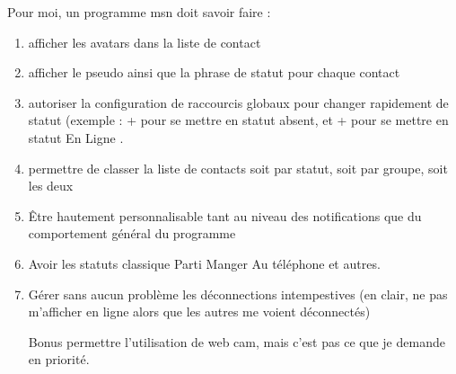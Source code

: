 \documentclass[a4paper,twoside]{article}
\begin{document}
Pour moi, un programme msn doit savoir faire :
\begin{enumerate}
 \item afficher les avatars dans la liste de contact
\item afficher le pseudo ainsi que la phrase de statut pour chaque contact
\item autoriser la configuration de raccourcis globaux pour changer rapidement de statut (exemple : + pour se mettre en statut absent, et + pour se mettre en statut \og En Ligne \fg.
\item permettre de classer la liste de contacts soit par statut, soit par groupe, soit les deux
\item \^Etre hautement personnalisable tant au niveau des notifications que du comportement général du programme
\item Avoir les statuts classique \og Parti Manger \fg   \og Au téléphone \fg  et autres.
\item Gérer sans aucun problème les déconnections intempestives (en clair, ne pas m'afficher en ligne alors que les autres me voient déconnectés)
\item[Bonus] permettre l'utilisation de web cam, mais c'est pas ce que je demande en priorité.
\end{enumerate}
\end{document}
